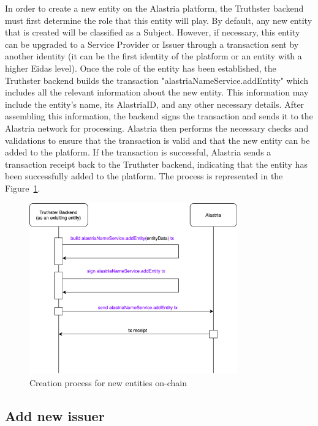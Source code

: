 \documentclass[target=mst,aauheader=]{thud}
\begin{document}
In order to create a new entity on the Alastria platform, the Truthster backend must first determine the role that this entity will play. By default, any new entity that is created will be classified as a Subject. However, if necessary, this entity can be upgraded to a Service Provider or Issuer through a transaction sent by another identity (it can be the first identity of the platform or an entity with a higher Eidas level).
Once the role of the entity has been established, the Truthster backend builds the transaction "alastriaNameService.addEntity" which includes all the relevant information about the new entity. This information may include the entity's name, its AlastriaID, and any other necessary details. After assembling this information, the backend signs the transaction and sends it to the Alastria network for processing.
Alastria then performs the necessary checks and validations to ensure that the transaction is valid and that the new entity can be added to the platform. If the transaction is successful, Alastria sends a transaction receipt back to the Truthster backend, indicating that the entity has been successfully added to the platform.
The process is represented in the Figure~\ref{fig:createNewGeneralEntity}.

\begin{figure}
    \centering
    \includegraphics[width=0.8\textwidth]{images/createNewGeneralEntity.png}
    \caption{Creation process for new entities on-chain}
    \label{fig:createNewGeneralEntity}
\end{figure}

\subsection{Add new issuer}
\end{document}
